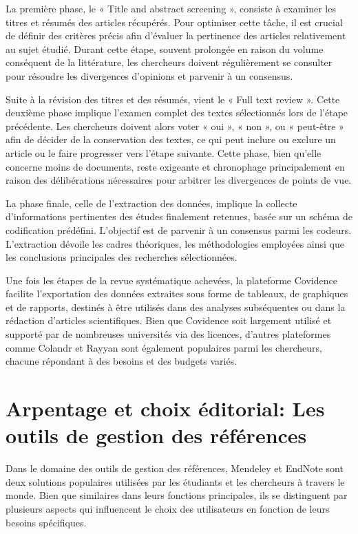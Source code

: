 \documentclass[
  letterpaper,
  DIV=11,
  numbers=noendperiod]{scrreprt}
\begin{document}
La première phase, le « Title and abstract screening », consiste à
examiner les titres et résumés des articles récupérés. Pour optimiser
cette tâche, il est crucial de définir des critères précis afin
d'évaluer la pertinence des articles relativement au sujet étudié.
Durant cette étape, souvent prolongée en raison du volume conséquent de
la littérature, les chercheurs doivent régulièrement se consulter pour
résoudre les divergences d'opinions et parvenir à un consensus.

Suite à la révision des titres et des résumés, vient le « Full text
review ». Cette deuxième phase implique l'examen complet des textes
sélectionnés lors de l'étape précédente. Les chercheurs doivent alors
voter « oui », « non », ou « peut-être » afin de décider de la
conservation des textes, ce qui peut inclure ou exclure un article ou le
faire progresser vers l'étape suivante. Cette phase, bien qu'elle
concerne moins de documents, reste exigeante et chronophage
principalement en raison des délibérations nécessaires pour arbitrer les
divergences de points de vue.

La phase finale, celle de l'extraction des données, implique la collecte
d'informations pertinentes des études finalement retenues, basée sur un
schéma de codification prédéfini. L'objectif est de parvenir à un
consensus parmi les codeurs. L'extraction dévoile les cadres théoriques,
les méthodologies employées ainsi que les conclusions principales des
recherches sélectionnées.

Une fois les étapes de la revue systématique achevées, la plateforme
Covidence facilite l'exportation des données extraites sous forme de
tableaux, de graphiques et de rapports, destinés à être utilisés dans
des analyses subséquentes ou dans la rédaction d'articles scientifiques.
Bien que Covidence soit largement utilisé et supporté par de nombreuses
universités via des licences, d'autres plateformes comme Colandr et
Rayyan sont également populaires parmi les chercheurs, chacune répondant
à des besoins et des budgets variés.

\section{Arpentage et choix éditorial: Les outils de gestion des
références}\label{arpentage-et-choix-uxe9ditorial-les-outils-de-gestion-des-ruxe9fuxe9rences}

Dans le domaine des outils de gestion des références, Mendeley et
EndNote sont deux solutions populaires utilisées par les étudiants et
les chercheurs à travers le monde. Bien que similaires dans leurs
fonctions principales, ils se distinguent par plusieurs aspects qui
influencent le choix des utilisateurs en fonction de leurs besoins
spécifiques.
\end{document}
